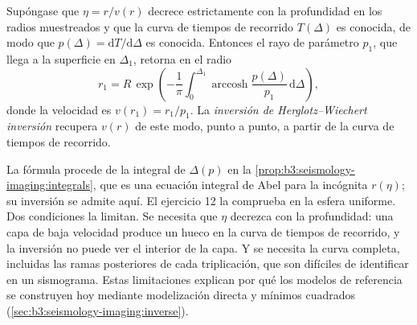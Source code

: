 \begin{omfigure}
\par{}
\label{fig:b3:seismology-imaging:tt}
\end{omfigure}

\begin{proposition}\label{prop:b3:seismology-imaging:herglotz}
Supóngase que $\eta = r/v(r)$ decrece estrictamente con la profundidad en los radios muestreados
y que la curva de tiempos de recorrido $T(\Delta)$ es conocida, de modo que $p(\Delta) =
\mathrm dT/\mathrm d\Delta$ es conocida. Entonces el rayo de parámetro $p_1$, que
llega a la superficie en $\Delta_1$, retorna en el radio
\[
  r_1 = R\,\exp\!\left(-\frac1\pi\int_0^{\Delta_1}
  \operatorname{arccosh}\frac{p(\Delta)}{p_1}\,\mathrm d\Delta\right),
\]
donde la velocidad es $v(r_1) = r_1/p_1$. La \emph{inversión de Herglotz--Wiechert
inversión} recupera $v(r)$ de este modo,
punto a punto, a partir de la curva de tiempos de recorrido.
\end{proposition}
\admitted

La fórmula procede de la integral de $\Delta(p)$ en la
\cref{prop:b3:seismology-imaging:integrals}, que es una ecuación integral de Abel para la incógnita
$r(\eta)$; su inversión se admite aquí.
El ejercicio 12 la comprueba en la esfera uniforme. Dos condiciones la limitan. Se necesita
que $\eta$ decrezca con la profundidad: una capa de baja velocidad produce un hueco en la
curva de tiempos de recorrido, y la inversión no puede ver el interior de la capa. Y se necesita
la curva completa, incluidas las ramas posteriores de cada triplicación, que son difíciles de
identificar en un sismograma. Estas limitaciones explican por qué los modelos de referencia se
construyen hoy mediante modelización directa y mínimos cuadrados (\cref{sec:b3:seismology-imaging:inverse}).

